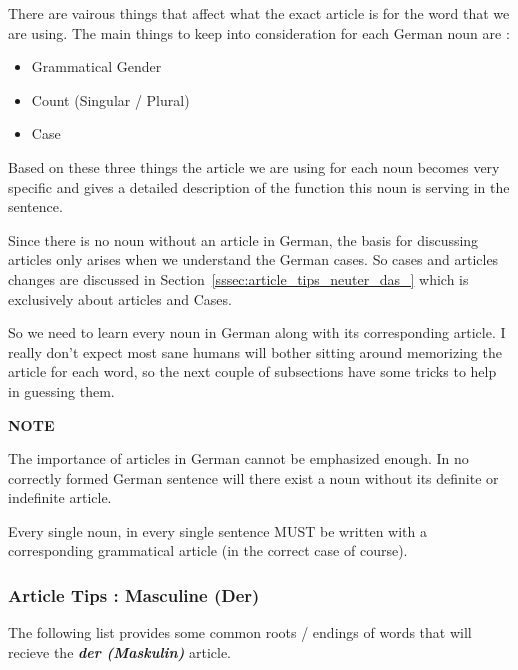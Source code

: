 \documentclass[a4paper,twocolumn,10pt]{article}
\newcommand{\newpar}
{\par \vspace{0.3cm}}
\newcommand{\tcolorboxstart}
{
	\nolinenumbers
	\vspace{0.2cm}
	\centering
}
\newcommand{\tcolorboxend}
{
	\justifying
	\vspace{0.2cm}
	\linenumbers
}
\newcommand{\tcolorboxnote}[1]
{

\tcolorboxstart
\begin{note-bg}

	\begin{note-theword}
		{\footnotesize \textbf{NOTE} }
	\end{note-theword}

	\begin{note-content} \justifying

		#1

	\end{note-content}

\end{note-bg}
\tcolorboxend
}
\begin{document}
There are vairous things that affect what the exact article is for the word that
we are using. The main things to keep into consideration for each German noun
are :

\nolinenumbers
\begin{itemize}[noitemsep]
	\item Grammatical Gender
	\item Count (Singular / Plural)
	\item Case
\end{itemize}
\linenumbers

Based on these three things the article we are using for each noun becomes very
specific and gives a detailed description of the function this noun is serving
in the sentence.\newpar

Since there is no noun without an article in German, the basis for discussing
articles only arises when we understand the German cases. So cases and articles
changes are discussed in Section~\ref{sssec:article_tips_neuter_das_} which is
exclusively about articles and Cases.\newpar

So we need to learn every noun in German along with its corresponding article. I
really don't expect most sane humans will bother sitting around memorizing the
article for each word, so the next couple of subsections have some tricks to
help in guessing them.



\tcolorboxnote
{

		The importance of articles in German cannot be emphasized enough. In no
		correctly formed German sentence will there exist a noun without its
		definite or indefinite article.\newpar

		Every single noun, in every single sentence MUST be written with a
		corresponding grammatical article (in the correct case of course).

}





\subsubsection{Article Tips : Masculine (Der)}
\label{sssec:article_tips_masculine_der_}

The following list provides some common roots / endings of words that will
recieve the \textbf{\textit{der (Maskulin)}} article.
\end{document}
